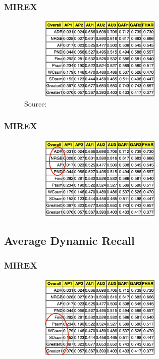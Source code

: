 \documentclass{beamer}
\begin{document}
	\begin{frame}
		\frametitle{MIREX}
		\begin{figure}[h!]
			\includegraphics[width=300px,height=150px,keepaspectratio]{mirex_result_example}
			\caption{Source: \cite{mirex_website_2007_results}}
		\end{figure}
	\end{frame}


	\begin{frame}
		\frametitle{MIREX}
		\begin{figure}[h!]
			\includegraphics[width=300px,height=150px,keepaspectratio]{mirex_result_example_change_one}
		\end{figure}
	\end{frame}

	\subsection{Average Dynamic Recall}

	
	\begin{frame}
		\frametitle{MIREX}
		\begin{figure}[h!]
			\includegraphics[width=300px,height=150px,keepaspectratio]{mirex_result_example_change_two}
		\end{figure}
	\end{frame}
\end{document}

